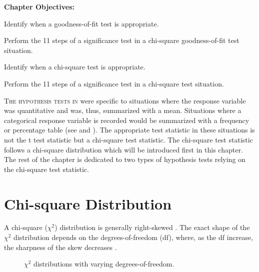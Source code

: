 \documentclass[10pt,openany]{book}\usepackage[]{graphicx}\usepackage[]{color}
\newenvironment{knitrout}{}{} %
\begin{document}
\begin{ChapObj}{\boxwidth}
  \textbf{Chapter Objectives:}
  \begin{Enumerate}
    \item Identify when a goodness-of-fit test is appropriate.
    \item Perform the 11 steps of a significance test in a chi-square goodness-of-fit test situation.
    \item Identify when a chi-square test is appropriate.
    \item Perform the 11 steps of a significance test in a chi-square test situation.
  \end{Enumerate}
\end{ChapObj}

\minitoc
\newpage

\lettrine{T}{he hypothesis tests in}  were specific to situations where the response variable was quantitative and was, thus, summarized with a mean.  Situations where a categorical response variable is recorded would be summarized with a frequency or percentage table (see  and ).  The appropriate test statistic in these situations is not the t test statistic but a chi-square test statistic.  The chi-square test statistic follows a chi-square distribution which will be introduced first in this chapter.  The rest of the chapter is dedicated to two types of hypothesis tests relying on the chi-square test statistic.

\vspace{-12pt}
\section{Chi-square Distribution}
\vspace{-12pt}
A chi-square ($\chi^2$) distribution is generally right-skewed .  The exact shape of the $\chi^2$ distribution depends on the degrees-of-freedom (df), where, as the df increase, the sharpness of the skew decreases .

\begin{knitrout}
\color{fgcolor}








\begin{figure}[hbtp]

{\centering {}

}

\caption[$\chi^2$ distributions with varying degrees-of-freedom]{$\chi^2$ distributions with varying degrees-of-freedom.}\label{fig:chiDist}
\end{figure}


\end{knitrout}
\end{document}
